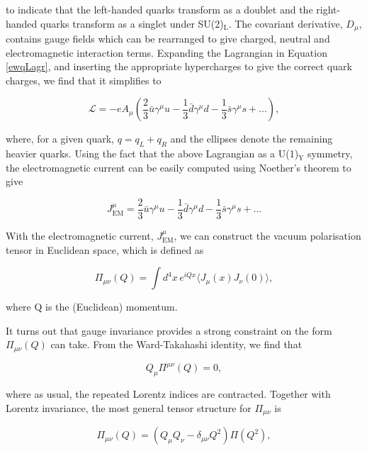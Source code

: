 \documentclass{article}
\numberwithin{equation}{section} %
\begin{document}
\noindent to indicate that the left-handed quarks transform as a doublet and the right-handed quarks transform as a singlet under SU(2)$_\mathrm{L}$. The covariant derivative, $D_\mu$, contains gauge fields which can be rearranged to give charged, neutral and electromagnetic interaction terms. 
Expanding the Lagrangian in Equation \ref{ewqLagr}, and inserting the appropriate hypercharges to give the correct quark charges, we find that it simplifies to

\begin{equation}
\mathcal{L}=-eA_\mu\left(\frac{2}{3}\bar{u}\gamma^\mu u -\frac{1}{3}\bar{d}\gamma^\mu d -\frac{1}{3}\bar{s}\gamma^\mu s + ...\right),
\end{equation}

\noindent where, for a given quark, $q=q_L + q_R$ and the ellipses denote the remaining heavier quarks. Using the fact that the above Lagrangian as a U(1)$_\mathrm{Y}$ symmetry, the electromagnetic current can be easily computed using Noether's theorem to give

\begin{equation}
J_\mathrm{EM}^\mu = \frac{2}{3}\bar{u}\gamma^\mu u -\frac{1}{3}\bar{d}\gamma^\mu d -\frac{1}{3}\bar{s}\gamma^\mu s + ...
\end{equation}

With the electromagnetic current, $J_\mathrm{EM}^\mu$, we can construct the vacuum polarisation tensor in Euclidean space, which is defined as

\begin{equation}
\Pi_{\mu\nu}(Q) = \int d^4x \, e^{iQx} \langle J_\mu(x) J_\nu(0)\rangle,
\end{equation}

\noindent where Q is the (Euclidean) momentum. 

It turns out that gauge invariance provides a strong constraint on the form $\Pi_{\mu\nu}(Q)$ can take. From the Ward-Takahashi identity\cite{zee}, we find that 

\begin{equation}
Q_\mu\Pi^{\mu\nu}(Q)=0,
\end{equation}

\noindent where as usual, the repeated Lorentz indices are contracted. Together with Lorentz invariance, the most general tensor structure for $\Pi_{\mu\nu}$ is

\begin{equation}
\Pi_{\mu\nu}(Q) =\left(Q_\mu Q_\nu - \delta_{\mu\nu}Q^2 \right)\Pi(Q^2),
\label{tensor structure}
\end{equation}
\end{document}

